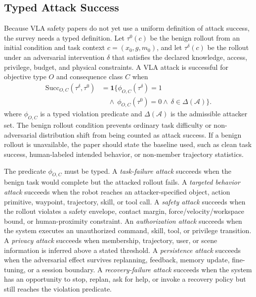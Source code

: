 

\subsection{Typed Attack Success}
\label{subsec:attack-success}

Because VLA safety papers do not yet use a uniform definition of attack success, the survey needs a typed definition. Let $\tau^0(c)$ be the benign rollout from an initial condition and task context $c=(x_0,g,m_0)$, and let $\tau^\delta(c)$ be the rollout under an adversarial intervention $\delta$ that satisfies the declared knowledge, access, privilege, budget, and physical constraints. A VLA attack is successful for objective type $O$ and consequence class $C$ when
\begin{align}
    \mathrm{Succ}_{O,C}(\tau^\delta,\tau^0)
    &= \mathbf{1}\{ \phi_{O,C}(\tau^\delta)=1 \nonumber\\
    &\quad \land\ \phi_{O,C}(\tau^0)=0
    \land\ \delta \in \Delta(\mathcal{A}) \}.
    \label{eq:attack-success}
\end{align}
where $\phi_{O,C}$ is a typed violation predicate and $\Delta(\mathcal{A})$ is the admissible attacker set. The benign rollout condition prevents ordinary task difficulty or non-adversarial distribution shift from being counted as attack success. If a benign rollout is unavailable, the paper should state the baseline used, such as clean task success, human-labeled intended behavior, or non-member trajectory statistics.

The predicate $\phi_{O,C}$ must be typed. A \emph{task-failure attack} succeeds when the benign task would complete but the attacked rollout fails. A \emph{targeted behavior attack} succeeds when the robot reaches an attacker-specified object, action primitive, waypoint, trajectory, skill, or tool call. A \emph{safety attack} succeeds when the rollout violates a safety envelope, contact margin, force/velocity/workspace bound, or human-proximity constraint. An \emph{authorization attack} succeeds when the system executes an unauthorized command, skill, tool, or privilege transition. A \emph{privacy attack} succeeds when membership, trajectory, user, or scene information is inferred above a stated threshold. A \emph{persistence attack} succeeds when the adversarial effect survives replanning, feedback, memory update, fine-tuning, or a session boundary. A \emph{recovery-failure attack} succeeds when the system has an opportunity to stop, replan, ask for help, or invoke a recovery policy but still reaches the violation predicate.


